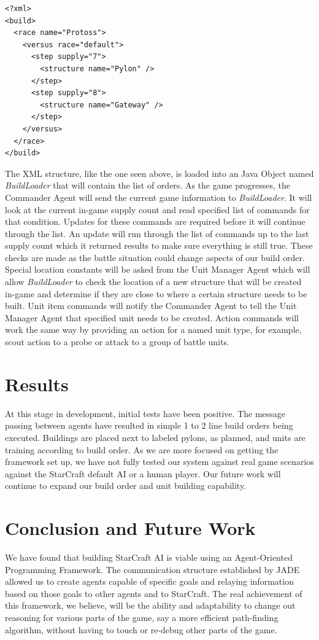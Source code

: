 \documentclass[letterpaper]{article}
\begin{document}
\begin{verbatim}
<?xml>
<build>
  <race name="Protoss">
    <versus race="default">
      <step supply="7">
        <structure name="Pylon" />
      </step>
      <step supply="8">
        <structure name="Gateway" />
      </step>
    </versus>
  </race>
</build>
\end{verbatim}

The XML structure, like the one seen above, is loaded into an Java Object named \emph{BuildLoader} that will contain the list of orders. As the game progresses, the Commander Agent will send the current game information to \emph{BuildLoader}. It will look at the current in-game supply count and read specified list of commands for that condition. Updates for these commands are required before it will continue through the list.  An update will run through the list of commands up to the last supply count which it returned results to make sure everything is still true. These checks are made as the battle situation could change aspects of our build order. Special location constants will be asked from the Unit Manager Agent which will allow \emph{BuildLoader} to check the location of a new structure that will be created in-game and determine if they are close to where a certain structure needs to be built. Unit item commands will notify the Commander Agent to tell the Unit Manager Agent that specified unit needs to be created. Action commands will work the same way by providing an action for a named unit type, for example, scout action to a probe or attack to a group of battle units.
\section{Results}
At this stage in development, initial tests have been positive.  The message passing between agents have resulted in simple 1 to 2 line build orders being executed.  Buildings are placed next to labeled pylons, as planned, and units are training according to build order.  As we are more focused on getting the framework set up, we have not fully tested our system against real game scenarios against the StarCraft default AI or a human player.  Our future work will continue to expand our build order and unit building capability.

\section{Conclusion and Future Work}
We have found that building StarCraft AI is viable using an Agent-Oriented Programming Framework.  The communication structure established by JADE allowed us to create agents capable of specific goals and relaying information based on those goals to other agents and to StarCraft.  The real achievement of this framework, we believe, will be the ability and adaptability to change out reasoning for various parts of the game, say a more efficient path-finding algorithm, without having to touch or re-debug other parts of the game.
\end{document}
